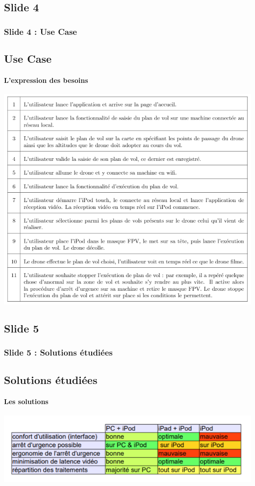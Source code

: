 \documentclass{beamer}
\begin{document}
	\begin{frame}
	\section{Slide 4}
		\begin{center}
		\frametitle{Slide 4 : Use Case}
		\subsection{Use Case}
        \framesubtitle{L'expression des besoins}
        \includegraphics[scale=0.5]{Use_Case.PNG}
       \end{center}
	\end{frame}
	
	\begin{frame}
	\section{Slide 5}
		\begin{center}
		\frametitle{Slide 5 : Solutions étudiées}
		\subsection{Solutions étudiées}
        \framesubtitle{Les solutions}
            \includegraphics[scale=0.9]{comparatif.PNG}
		\end{center}
	\end{frame}
	
\end{document}
